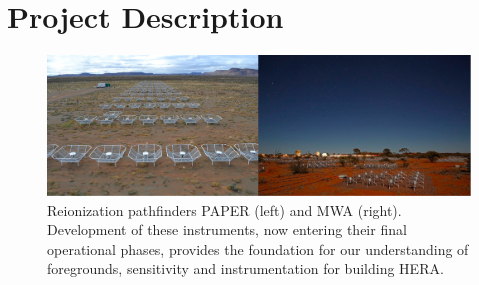 \documentclass[preprint]{aastex}
\begin{document}
\begin{figure}[t]
{$$}\label{fig:twoFGViews}
\end{figure}






\vspace{-0.25in}
\section{Project Description}
\label{PDsec}
\begin{figure}[!ht]\centering
\includegraphics[width=6.5in]{plots/PAPER_and_MWA.jpg}
\caption{\small
Reionization pathfinders PAPER (left) and MWA (right). Development of these instruments, now entering their final operational phases, provides the foundation for our understanding of foregrounds, sensitivity and instrumentation for building HERA.
}
\end{figure}
\end{document}
